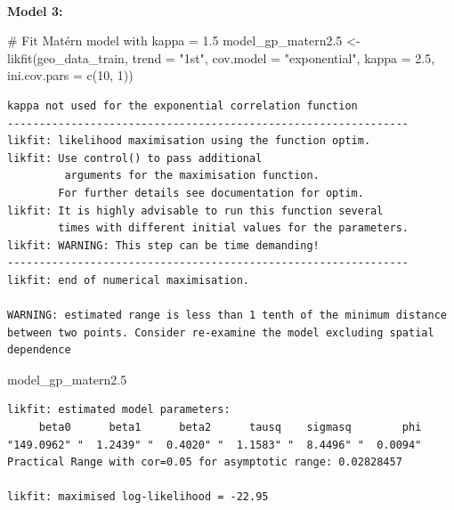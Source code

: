 \documentclass[
  11pt,
]{article}
\makeatletter
\let\oldparagraph\paragraph
\renewcommand{\paragraph}{
    \@ifstar
      \xxxParagraphStar
      \xxxParagraphNoStar
  }
\newcommand{\xxxParagraphStar}[1]{\oldparagraph*{#1}\mbox{}}
\newcommand{\xxxParagraphNoStar}[1]{\oldparagraph{#1}\mbox{}}
\newenvironment{Shaded}{\begin{snugshade}}{\end{snugshade}}
\newcommand{\AttributeTok}[1]{\textcolor[rgb]{0.40,0.45,0.13}{#1}}
\newcommand{\CommentTok}[1]{\textcolor[rgb]{0.37,0.37,0.37}{#1}}
\newcommand{\DecValTok}[1]{\textcolor[rgb]{0.68,0.00,0.00}{#1}}
\newcommand{\FloatTok}[1]{\textcolor[rgb]{0.68,0.00,0.00}{#1}}
\newcommand{\FunctionTok}[1]{\textcolor[rgb]{0.28,0.35,0.67}{#1}}
\newcommand{\NormalTok}[1]{\textcolor[rgb]{0.00,0.23,0.31}{#1}}
\newcommand{\OtherTok}[1]{\textcolor[rgb]{0.00,0.23,0.31}{#1}}
\newcommand{\StringTok}[1]{\textcolor[rgb]{0.13,0.47,0.30}{#1}}
\makeatother
\begin{document}
\paragraph{\texorpdfstring{\textbf{Model 3:}}{Model 3:}}\label{model-3}

\begin{Shaded}
\begin{Highlighting}[]
\CommentTok{\# Fit Matérn model with kappa = 1.5}
\NormalTok{model\_gp\_matern2}\FloatTok{.5} \OtherTok{\textless{}{-}} \FunctionTok{likfit}\NormalTok{(geo\_data\_train, }\AttributeTok{trend =} \StringTok{"1st"}\NormalTok{, }\AttributeTok{cov.model =} \StringTok{"exponential"}\NormalTok{, }\AttributeTok{kappa =} \FloatTok{2.5}\NormalTok{, }\AttributeTok{ini.cov.pars =} \FunctionTok{c}\NormalTok{(}\DecValTok{10}\NormalTok{, }\DecValTok{1}\NormalTok{))}
\end{Highlighting}
\end{Shaded}

\begin{verbatim}
kappa not used for the exponential correlation function
---------------------------------------------------------------
likfit: likelihood maximisation using the function optim.
likfit: Use control() to pass additional
         arguments for the maximisation function.
        For further details see documentation for optim.
likfit: It is highly advisable to run this function several
        times with different initial values for the parameters.
likfit: WARNING: This step can be time demanding!
---------------------------------------------------------------
likfit: end of numerical maximisation.

WARNING: estimated range is less than 1 tenth of the minimum distance between two points. Consider re-examine the model excluding spatial dependence
\end{verbatim}

\begin{Shaded}
\begin{Highlighting}[]
\NormalTok{model\_gp\_matern2}\FloatTok{.5}
\end{Highlighting}
\end{Shaded}

\begin{verbatim}
likfit: estimated model parameters:
     beta0      beta1      beta2      tausq    sigmasq        phi 
"149.0962" "  1.2439" "  0.4020" "  1.1583" "  8.4496" "  0.0094" 
Practical Range with cor=0.05 for asymptotic range: 0.02828457

likfit: maximised log-likelihood = -22.95
\end{verbatim}
\end{document}
